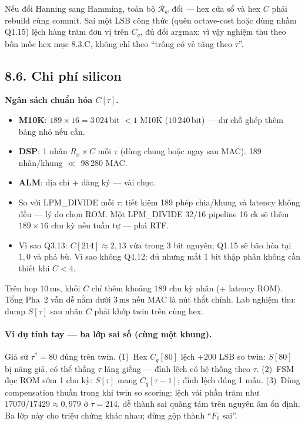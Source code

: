 Nếu đổi Hanning sang Hamming, toàn bộ $\mathcal{R}_w$ đổi --- hex cửa sổ và hex $C$ phải rebuild cùng commit. Sai một LSB công thức (quên octave-cost hoặc dùng nhầm Q1.15) lệch hàng trăm đơn vị trên $C_q$, đủ đổi argmax; vì vậy nghiệm thu theo bốn mốc hex mục 8.3.C, không chỉ theo ``trông có vẻ tăng theo $\tau$''.

\subsection*{8.6. Chi phí silicon}

\begin{costbox}
\textbf{Ngân sách chuẩn hóa $C[\tau]$.}
\begin{itemize}[leftmargin=1.2em]
\item \textbf{M10K}: $189\times 16 = 3\,024$\,bit $< 1$ M10K ($10\,240$\,bit) --- dư chỗ ghép thêm bảng nhỏ nếu cần.
\item \textbf{DSP}: 1 nhân $R_x\times C$ mỗi $\tau$ (dùng chung hoặc ngay sau MAC). 189 nhân/khung $\ll$ 98\,280 MAC.
\item \textbf{ALM}: địa chỉ + đăng ký --- vài chục.
\item So với LPM\_DIVIDE mỗi $\tau$: tiết kiệm 189 phép chia/khung và latency không đều --- lý do chọn ROM. Một LPM\_DIVIDE 32/16 pipeline 16 ck sẽ thêm $189\times 16$ chu kỳ nếu tuần tự --- phá RTF.
\item Vì sao Q3.13: $C[214]\approx 2{,}13$ vừa trong 3 bit nguyên; Q1.15 sẽ bão hòa tại $1{,}0$ và phá bù. Vì sao không Q4.12: đủ nhưng mất 1 bit thập phân không cần thiết khi $C<4$.
\end{itemize}
\end{costbox}

Trên hop $10\,\text{ms}$, khối $C$ chỉ thêm khoảng 189 chu kỳ nhân (+ latency ROM). Tổng Pha~2 vẫn dễ nằm dưới $3\,\text{ms}$ nếu MAC là nút thắt chính. Lab nghiệm thu: dump $S[\tau]$ sau nhân $C$ phải khớp twin trên cùng hex.

\paragraph{Ví dụ tính tay --- ba lớp sai số (cùng một khung).}
Giả sử $\tau^*=80$ đúng trên twin. (1)~Hex $C_q[80]$ lệch $+200$ LSB so twin: $S[80]$ bị nâng giả, có thể thắng $\tau$ láng giềng --- đỉnh lệch có hệ thống theo $\tau$. (2)~FSM đọc ROM sớm 1 chu kỳ: $S[\tau]$ mang $C_q[\tau-1]$; đỉnh lệch đúng 1 mẫu. (3)~Dùng compensation thuần trong khi twin so scoring: lệch vài phần trăm như $17070/17429\approx 0{,}979$ ở $\tau=214$, dễ thành sai quãng tám trên nguyên âm ổn định. Ba lớp này cho triệu chứng khác nhau; đừng gộp thành ``$F_0$ sai''.

